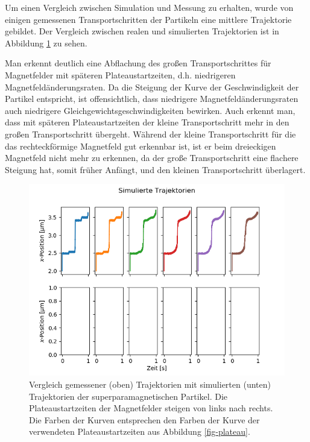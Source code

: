 \documentclass[page,pdftex,12pt,a4paper,twoside,openright]{scrbook}
\begin{document}
Um einen Vergleich zwischen Simulation und Messung zu erhalten, wurde von einigen gemessenen Transportschritten der Partikeln eine mittlere Trajektorie gebildet. Der Vergleich zwischen realen und simulierten Trajektorien ist in Abbildung \ref{fig-traj} zu sehen.

Man erkennt deutlich eine Abflachung des großen Transportschrittes für Magnetfelder mit späteren Plateaustartzeiten, d.h. niedrigeren Magnetfeldänderungsraten. Da die Steigung der Kurve der Geschwindigkeit der Partikel entspricht, ist offensichtlich, dass niedrigere Magnetfeldänderungsraten auch niedrigere Gleichgewichtsgeschwindigkeiten bewirken. Auch erkennt man, dass mit späteren Plateaustartzeiten der kleine Transportschritt mehr in den großen Transportschritt übergeht. Während der kleine Transportschritt für die das rechteckförmige Magnetfeld gut erkennbar ist, ist er beim dreieckigen Magnetfeld nicht mehr zu erkennen, da der große Transportschritt eine flachere Steigung hat, somit früher Anfängt, und den kleinen Transportschritt überlagert.

\begin{figure}[htbp]
\centering
\includegraphics[width=\textwidth]{./img/sim.png}
\caption{\label{fig-traj}
Vergleich gemessener (oben) Trajektorien mit simulierten (unten) Trajektorien der superparamagnetischen Partikel. Die Plateaustartzeiten der Magnetfelder steigen von links nach rechts. Die Farben der Kurven entsprechen den Farben der Kurve der verwendeten Plateaustartzeiten aus Abbildung \ref{fig-plateau}.}
\end{figure}
\end{document}
